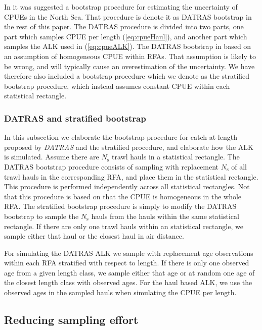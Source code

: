 \documentclass[a4paper 12pt]{article}
\numberwithin{equation}{section}
\begin{document}
In \citep{ICES2013} it was suggested a bootstrap procedure for estimating the uncertainty of CPUEs in the North Sea. That procedure is denote it as DATRAS bootstrap in the rest of this paper. The DATRAS procedure is divided into two parts, one part which samples CPUE per length (\ref{eq:cpueHaul}), and another part which samples the ALK used in (\ref{eq:cpueALK}). The DATRAS bootstrap in based on an assumption of homogeneous CPUE within RFAs. That assumption is likely to be wrong, and will typically cause an overestimation of the uncertainty. We have therefore also included a bootstrap procedure which we denote as the stratified bootstrap procedure, which instead assumes constant CPUE within each statistical rectangle. 

\subsubsection{DATRAS and stratified bootstrap}
\indent In this subsection we elaborate the bootstrap procedure for catch at length proposed by \emph{DATRAS} \citep{ICES2013} and the stratified procedure, and elaborate how the ALK is simulated. Assume there are $N_{\text{s}}$ trawl hauls in a statistical rectangle. The DATRAS bootstrap procedure consists of sampling with replacement $N_{\text{s}}$ of all trawl hauls in the corresponding RFA, and place them in the statistical rectangle. This procedure is performed independently across all statistical rectangles. Not that this procedure is based on that the CPUE is homogeneous in the whole RFA. The stratified bootstrap procedure is simply to modify the DATRAS bootstrap to sample the $N_{\text{s}}$ hauls from the hauls within the same statistical rectangle. If there are only one trawl hauls within an statistical rectangle, we sample either that haul or the closest haul in air distance.

For simulating the DATRAS ALK we sample with replacement age observations within each RFA stratified with respect to length. If there is only one observed age from a given length class, we sample either that age or at random one age of the closest length class with observed ages. For the haul based ALK, we use the observed ages in the sampled hauls when simulating the CPUE per length.


\subsection{Reducing sampling effort}
\label{sec:optimizationsampling}
\end{document}
